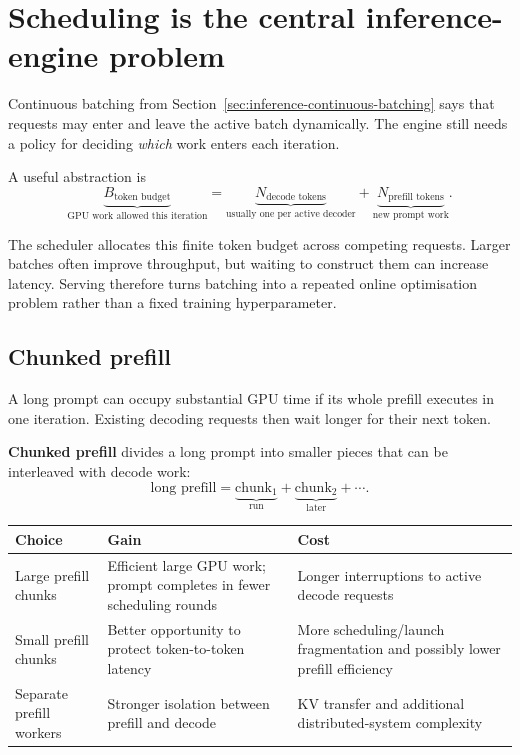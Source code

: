 \section{Scheduling is the central inference-engine problem}
\label{sec:inference-scheduling}
Continuous batching from Section~\ref{sec:inference-continuous-batching} says that requests may enter and leave the active batch dynamically.
The engine still needs a policy for deciding \emph{which} work enters each iteration.

A useful abstraction is
\[
\underbrace{B_{\text{token budget}}}_{\text{GPU work allowed this iteration}}
=
\underbrace{N_{\text{decode tokens}}}_{\text{usually one per active decoder}}
+
\underbrace{N_{\text{prefill tokens}}}_{\text{new prompt work}}.
\]

The scheduler allocates this finite token budget across competing requests.
Larger batches often improve throughput, but waiting to construct them can increase latency.
Serving therefore turns batching into a repeated online optimisation problem rather than a fixed training hyperparameter.

\subsection{Chunked prefill}
\label{subsec:inference-chunked-prefill}
A long prompt can occupy substantial GPU time if its whole prefill executes in one iteration.
Existing decoding requests then wait longer for their next token.

\textbf{Chunked prefill} divides a long prompt into smaller pieces that can be interleaved with decode work:
\[
\text{long prefill}
=
\underbrace{\text{chunk}_1}_{\text{run}}
+
\underbrace{\text{chunk}_2}_{\text{later}}
+
\cdots.
\]

\begin{center}
\small
\begin{tabularx}{.96\linewidth}{@{}L{.23\linewidth}YY@{}}
\toprule
\textbf{Choice} & \textbf{Gain} & \textbf{Cost} \\
\midrule
Large prefill chunks
& Efficient large GPU work; prompt completes in fewer scheduling rounds
& Longer interruptions to active decode requests \\
Small prefill chunks
& Better opportunity to protect token-to-token latency
& More scheduling/launch fragmentation and possibly lower prefill efficiency \\
Separate prefill workers
& Stronger isolation between prefill and decode
& KV transfer and additional distributed-system complexity \\
\bottomrule
\end{tabularx}
\end{center}

